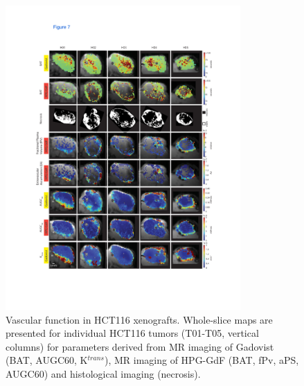 \begin{figure}[htbp]   
 \begin{center}  
 \includegraphics[width=0.8\textwidth]{hpg/hpg-paper1-images/hpg_fig7-hct116.pdf}
 \caption{Vascular function in HCT116 xenografts. Whole-slice maps are presented for individual HCT116 tumors (T01-T05, vertical columns) for parameters derived from MR imaging of Gadovist (BAT, AUGC60, K$^{trans}$), MR imaging of HPG-GdF (BAT, fPv, aPS, AUGC60) and histological imaging (necrosis).}
 \label{hpgpaper1:fig7}  
 \end{center}
\end{figure}

